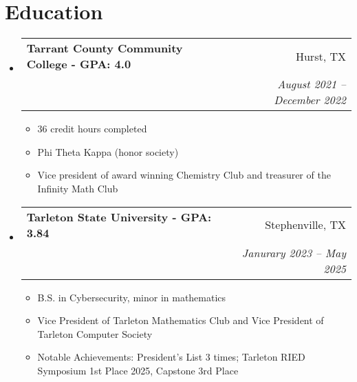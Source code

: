 \documentclass[letterpaper,11pt]{article}
\makeatletter
\newcommand{\resumeItem}[1]{
  \item\small{
    {#1 \vspace{-2pt}}
  }
}
\newcommand{\resumeSubheading}[4]{
  \item
  \begin{tabular*}{0.97\textwidth}[t]{l@{\extracolsep{\fill}}r}
    \textbf{#1} & #2 \\
    \textit{\small#3} & \textit{\small #4} \\
  \end{tabular*}
}
\newcommand{\resumeSubHeadingListStart}{
  \begin{itemize}[leftmargin=0.15in, label={}, topsep=-3pt, itemsep=-3pt]
}
\newcommand{\resumeSubHeadingListEnd}{
  \end{itemize}
}
\newcommand{\resumeItemListStart}{\begin{itemize}}
\newcommand{\resumeItemListEnd}{\end{itemize}\vspace{-5pt}}
\makeatother
\begin{document}
\section{Education}
\resumeSubHeadingListStart
    \resumeSubheading
      {Tarrant County Community College \textnormal{- GPA: 4.0}}{Hurst, TX}
      {}{August 2021 -- December 2022}
      \resumeItemListStart
        \resumeItem{36 credit hours completed}
        \resumeItem{Phi Theta Kappa (honor society)}
        \resumeItem{Vice president of award winning Chemistry Club and treasurer of the Infinity Math Club}
      \resumeItemListEnd
  \resumeSubHeadingListEnd
  \resumeSubHeadingListStart
    \resumeSubheading
      {Tarleton State University \textnormal{- GPA: 3.84}}{Stephenville, TX}
      {}{Janurary 2023 -- May 2025}
      \resumeItemListStart
        \resumeItem{B.S. in Cybersecurity, minor in mathematics}
        \resumeItem{Vice President of Tarleton Mathematics Club and Vice President of Tarleton Computer Society}
        \resumeItem{Notable Achievements: President's List 3 times; Tarleton RIED Symposium 1st Place 2025, Capstone 3rd Place}
      \resumeItemListEnd
  \resumeSubHeadingListEnd

\end{document}
